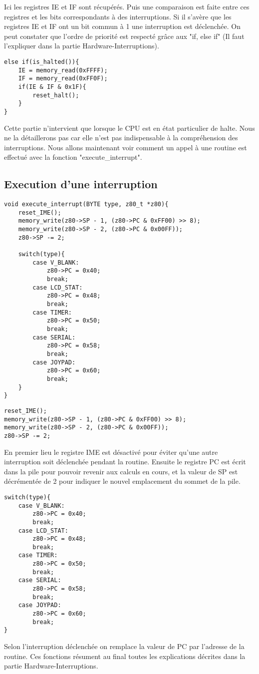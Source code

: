 \documentclass{report}
\begin{document}
Ici les registres IE et IF sont récupérés. Puis une comparaison est faite entre ces registres et les bits correspondants à des interruptions. Si il s'avère que les registres IE et IF ont un bit commun à 1 une interruption est déclenchée. On peut constater que l'ordre de priorité est respecté grâce aux "if, else if" (Il faut l'expliquer dans la partie Hardware-Interruptions).
\begin{lstlisting}
else if(is_halted()){
	IE = memory_read(0xFFFF);
	IF = memory_read(0xFF0F);
	if(IE & IF & 0x1F){
		reset_halt();
	}
}
\end{lstlisting}
Cette partie n'intervient que lorsque le CPU est en état particulier de halte. 
Nous ne la détaillerons pas car elle n'est pas indispensable à la compréhension des interruptions.
Nous allons maintenant voir comment un appel à une routine est effectué avec la fonction "execute\_interrupt".
\subsection{Execution d'une interruption}
\begin{lstlisting}
void execute_interrupt(BYTE type, z80_t *z80){
	reset_IME();
	memory_write(z80->SP - 1, (z80->PC & 0xFF00) >> 8);
	memory_write(z80->SP - 2, (z80->PC & 0x00FF));
	z80->SP -= 2;

	switch(type){
		case V_BLANK:	
			z80->PC = 0x40;
			break;
		case LCD_STAT:
			z80->PC = 0x48;
			break;
		case TIMER:
			z80->PC = 0x50;
			break;
		case SERIAL:
			z80->PC = 0x58;
			break;
		case JOYPAD:
			z80->PC = 0x60;
			break;
	}
}
\end{lstlisting}
\begin{lstlisting}
reset_IME();
memory_write(z80->SP - 1, (z80->PC & 0xFF00) >> 8);
memory_write(z80->SP - 2, (z80->PC & 0x00FF));
z80->SP -= 2;
\end{lstlisting}
En premier lieu le registre IME est désactivé pour éviter qu'une autre interruption soit déclenchée pendant la routine. Ensuite le registre PC est écrit dans la pile pour pouvoir revenir aux calculs en cours, et la valeur de SP est décrémentée de 2 pour indiquer le nouvel emplacement du sommet de la pile.
\begin{lstlisting}
switch(type){
	case V_BLANK:	
		z80->PC = 0x40;
		break;
	case LCD_STAT:
		z80->PC = 0x48;
		break;
	case TIMER:
		z80->PC = 0x50;
		break;
	case SERIAL:
		z80->PC = 0x58;
		break;
	case JOYPAD:
		z80->PC = 0x60;
		break;
}
\end{lstlisting}
Selon l'interruption déclenchée on remplace la valeur de PC par l'adresse de la routine.
Ces fonctions résument au final toutes les explications décrites dans la partie Hardware-Interruptions.
\end{document}
